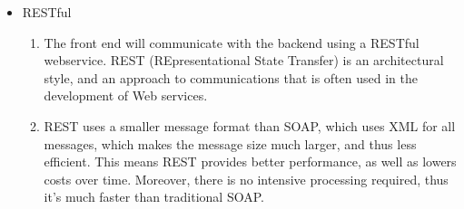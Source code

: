 \begin{itemize}
		\item RESTful
		\begin{enumerate}
			\item The front end will communicate with the backend using a RESTful webservice. REST (REpresentational State Transfer) is an architectural style, and an approach to communications that is often used in the development of Web services. 
			
			\item REST uses a smaller message format than SOAP, which uses XML for all messages, which makes the message size much larger, and thus less efficient. This means REST provides better performance, as well as lowers costs over time. Moreover, there is no intensive processing required, thus it’s much faster than traditional SOAP.
		\end{enumerate}
\end{itemize}